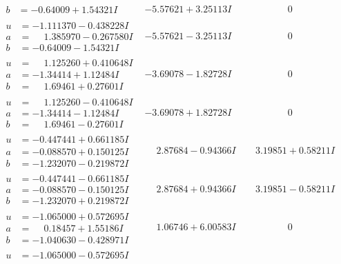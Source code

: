 \documentclass[1p]{elsarticle_modified}
\theoremstyle{definition}
\begin{document}
$$\begin{array}{c|c|c}
\begin{aligned}
b &= -0.64009 + 1.54321 I\end{aligned}
 & -5.57621 + 3.25113 I & \phantom{-0.000000 } 0 \\ \hline\begin{aligned}
u &= -1.111370 - 0.438228 I \\
a &= \phantom{-}1.385970 - 0.267580 I \\
b &= -0.64009 - 1.54321 I\end{aligned}
 & -5.57621 - 3.25113 I & \phantom{-0.000000 } 0 \\ \hline\begin{aligned}
u &= \phantom{-}1.125260 + 0.410648 I \\
a &= -1.34414 + 1.12484 I \\
b &= \phantom{-}1.69461 + 0.27601 I\end{aligned}
 & -3.69078 - 1.82728 I & \phantom{-0.000000 } 0 \\ \hline\begin{aligned}
u &= \phantom{-}1.125260 - 0.410648 I \\
a &= -1.34414 - 1.12484 I \\
b &= \phantom{-}1.69461 - 0.27601 I\end{aligned}
 & -3.69078 + 1.82728 I & \phantom{-0.000000 } 0 \\ \hline\begin{aligned}
u &= -0.447441 + 0.661185 I \\
a &= -0.088570 + 0.150125 I \\
b &= -1.232070 - 0.219872 I\end{aligned}
 & \phantom{-}2.87684 - 0.94366 I & \phantom{-}3.19851 + 0.58211 I \\ \hline\begin{aligned}
u &= -0.447441 - 0.661185 I \\
a &= -0.088570 - 0.150125 I \\
b &= -1.232070 + 0.219872 I\end{aligned}
 & \phantom{-}2.87684 + 0.94366 I & \phantom{-}3.19851 - 0.58211 I \\ \hline\begin{aligned}
u &= -1.065000 + 0.572695 I \\
a &= \phantom{-}0.18457 + 1.55186 I \\
b &= -1.040630 - 0.428971 I\end{aligned}
 & \phantom{-}1.06746 + 6.00583 I & \phantom{-0.000000 } 0 \\ \hline\begin{aligned}
u &= -1.065000 - 0.572695 I \\

\end{aligned}
\end{array}$$
\end{document}
